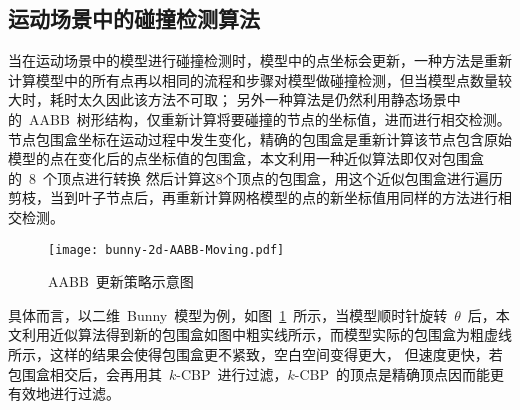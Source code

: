 \subsection{运动场景中的碰撞检测算法}
\label{subsec:moving:cd}

当在运动场景中的模型进行碰撞检测时，模型中的点坐标会更新，一种方法是重新计算模型中的所有点再以相同的流程和步骤对模型做碰撞检测，但当模型点数量较大时，耗时太久因此该方法不可取；
另外一种算法是仍然利用静态场景中的~AABB~树形结构，仅重新计算将要碰撞的节点的坐标值，进而进行相交检测。
节点包围盒坐标在运动过程中发生变化，精确的包围盒是重新计算该节点包含原始模型的点在变化后的点坐标值的包围盒，本文利用一种近似算法即仅对包围盒的~8~个顶点进行转换
然后计算这8个顶点的包围盒，用这个近似包围盒进行遍历剪枝，当到叶子节点后，再重新计算网格模型的点的新坐标值用同样的方法进行相交检测。

\begin{figure}[H]
  \centering
  \texttt{[image: bunny-2d-AABB-Moving.pdf]}
  \caption{AABB~更新策略示意图}
  \label{fig:bunny:moving}
\end{figure}

具体而言，以二维~Bunny~模型为例，如图~\ref{fig:bunny:moving}~所示，当模型顺时针旋转~$\theta$~后，本文利用近似算法得到新的包围盒如图中粗实线所示，而模型实际的包围盒为粗虚线所示，这样的结果会使得包围盒更不紧致，空白空间变得更大，
但速度更快，若包围盒相交后，会再用其~$k$-CBP~进行过滤，$k$-CBP~的顶点是精确顶点因而能更有效地进行过滤。

